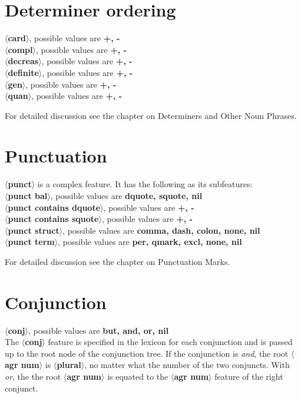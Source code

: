 \section{Determiner ordering}
{\bf $\langle$card$\rangle$}, possible values are {\bf +, -}\\
{\bf $\langle$compl$\rangle$}, possible values are {\bf +, -}\\
{\bf $\langle$decreas$\rangle$}, possible values are {\bf +, -}\\
{\bf $\langle$definite$\rangle$}, possible values are {\bf +, -}\\
{\bf $\langle$gen$\rangle$}, possible values are {\bf +, -}\\
{\bf $\langle$quan$\rangle$}, possible values are {\bf +, -}

For detailed discussion see the chapter on Determiners and Other
Noun Phrases.

\section{Punctuation}
{\bf $\langle$punct$\rangle$} is a complex feature. It has the following
as its subfeatures:\\
{\bf $\langle$punct bal$\rangle$}, possible values are {\bf dquote, squote, nil}\\
{\bf $\langle$punct contains dquote$\rangle$}, possible values are {\bf +, -}\\
{\bf $\langle$punct contains squote$\rangle$}, possible values are {\bf +, -}\\
{\bf $\langle$punct struct$\rangle$}, possible values are {\bf comma, dash, colon, 
none, nil}\\
{\bf $\langle$punct term$\rangle$}, possible values are {\bf per, qmark, excl, 
none, nil}

For detailed discussion see the chapter on Punctuation Marks.


\section{Conjunction}
{\bf $\langle$conj$\rangle$}, possible values are {\bf but, and, or, nil}\\
The {\bf $\langle$conj$\rangle$} feature is specified in the lexicon
for each conjunction and is passed up to the root node 
of the conjunction tree. If the conjunction is {\em and}, the 
root {\bf $\langle$agr num$\rangle$} is {\bf $\langle$plural$\rangle$}, no
matter what the number of the two conjuncts. With {\em or}, the
the root {\bf $\langle$agr num$\rangle$} is equated to the
{\bf $\langle$agr num$\rangle$} feature of the right conjunct. 


